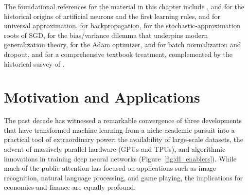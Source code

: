 \documentclass[11pt,a4paper]{report}
\begin{document}
The foundational references for the material in this chapter include \citet{mcculloch1943logical}, \citet{hebb1949organization} and \citet{rosenblatt1958perceptron} for the historical origins of artificial neurons and the first learning rules, \citet{cybenko1989approximation} and \citet{hornik1989multilayer} for universal approximation, \citet{rumelhart1986learning} for backpropagation, \citet{robbins1951stochastic} for the stochastic-approximation roots of SGD, \citet{geman1992biasvariance} for the bias/variance dilemma that underpins modern generalization theory, \citet{kingma2015adam} for the Adam optimizer, \citet{ioffe2015batch} and \citet{srivastava2014dropout} for batch normalization and dropout, and \citet{goodfellow2016deep} for a comprehensive textbook treatment, complemented by the historical survey of \citet{schmidhuber2015deep}.

\section{Motivation and Applications}

The past decade has witnessed a remarkable convergence of three developments that have transformed machine learning from a niche academic pursuit into a practical tool of extraordinary power: the availability of large-scale datasets, the advent of massively parallel hardware (GPUs and TPUs), and algorithmic innovations in training deep neural networks (Figure~\ref{fig:dl_enablers}).  While much of the public attention has focused on applications such as image recognition, natural language processing, and game playing, the implications for economics and finance are equally profound.
\end{document}
